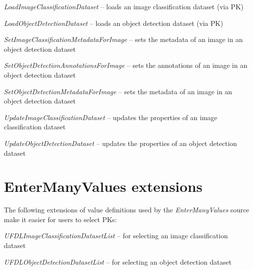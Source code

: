 \documentclass[a4paper]{book}
\begin{document}
\begin{tight_itemize}
  \item \textit{LoadImageClassificationDataset} -- loads an image classification dataset (via PK)
  \item \textit{LoadObjectDetectionDataset} -- loads an object detection dataset (via PK)
  \item \textit{SetImageClassificationMetadataForImage} -- sets the metadata of an image in an object detection dataset
  \item \textit{SetObjectDetectionAnnotationsForImage} -- sets the annotations of an image in an object detection dataset
  \item \textit{SetObjectDetectionMetadataForImage} -- sets the metadata of an image in an object detection dataset
  \item \textit{UpdateImageClassificationDataset} -- updates the properties of an image classification dataset
  \item \textit{UpdateObjectDetectionDataset} -- updates the properties of an object detection dataset
\end{tight_itemize}

\section{EnterManyValues extensions}
The following extensions of value definitions used by the \textit{EnterManyValues}
source make it easier for users to select PKs:
\begin{tight_itemize}
  \item \textit{UFDLImageClassificationDatasetList} -- for selecting an image classification dataset
  \item \textit{UFDLObjectDetectionDatasetList} -- for selecting an object detection dataset
\end{tight_itemize}


\end{document}
